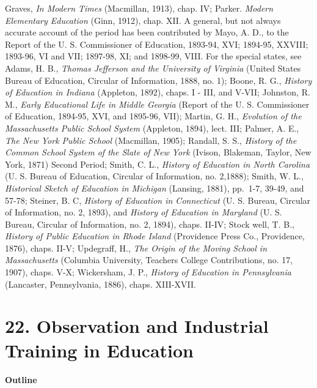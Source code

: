 \documentclass[]{book}
\begin{document}
Graves, \emph{In Modern Times} (Macmillan, 1913), chap. IV; Parker. \emph{Modern Elementary Education} (Ginn, 1912), chap. XII. A general, but not always accurate account of the period has been contributed by Mayo, A. D., to the Report of the U. S. Commissioner of Education, 1893-94, XVI; 1894-95, XXVIII; 1893-96, VI and VII; 1897-98, XI; and 1898-99, VIII. For the special states, see Adams, H. B., \emph{Thomas Jefferson and the University of Virginia} (United States Bureau of Education, Circular of Information, 1888, no. 1); Boone, R. G., \emph{History of Education in Indiana} (Appleton, 1892), chaps. I - III, and V-VII; Johnston, R. M., \emph{Early Educational Life in Middle Georgia} (Report of the U. S. Commissioner of Education, 1894-95, XVI, and 1895-96, VII); Martin, G. H., \emph{Evolution of the Massachusetts Public School System} (Appleton, 1894), lect. III; Palmer, A. E., \emph{The New York Public School} (Macmillan, 1905); Randall, S. S., \emph{History of the Common School System of the Slate of New York} (Ivison, Blakeman, Taylor, New York, 1871) Second Period; Smith, C. L., \emph{History of Education in North Carolina} (U. S. Bureau of Education, Circular of Information, no. 2,1888); Smith, W. L., \emph{Historical Sketch of Education in Michigan} (Lansing, 1881), pp.~1-7, 39-49, and 57-78; Steiner, B. C, \emph{History of Education in Connecticut} (U. S. Bureau, Circular of Information, no. 2, 1893), and \emph{History of Education in Maryland} (U. S. Bureau, Circular of Information, no. 2, 1894), chaps. II-IV; Stock well, T. B., \emph{History of Public Education in Rhode Island} (Providence Press Co., Providence, 1876), chaps. II-V; Updegraff, H., \emph{The Origin of the Moving School in Massachusetts} (Columbia University, Teachers College Contributions, no. 17, 1907), chaps. V-X; Wickersham, J. P., \emph{History of Education in Pennsylvania} (Lancaster, Pennsylvania, 1886), chaps. XIII-XVII.

\hypertarget{observation-and-industrial-training-in-education}{%
\chapter{22. Observation and Industrial Training in Education}\label{observation-and-industrial-training-in-education}}

\textbf{Outline}
\end{document}
